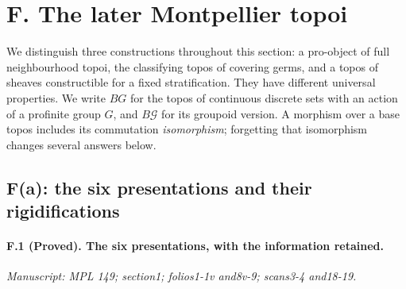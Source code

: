 \section{F. The later Montpellier topoi}
\label{sec:F}

We distinguish three constructions throughout this section: a pro-object of
full neighbourhood topoi, the classifying topos of covering germs, and a topos
of sheaves constructible for a fixed stratification. They have different
universal properties. We write $B G$ for the topos of continuous discrete
sets with an action of a profinite group $G$, and $B\mathcal G$ for its
groupoid version. A morphism over a base topos includes its commutation
\emph{isomorphism}; forgetting that isomorphism changes several answers below.

\subsection{F(a): the six presentations and their rigidifications}

\paragraph{F.1 (Proved). The six presentations, with the information retained.}
\textit{Manuscript: MPL 149; section1; folios1-1v and8v-9; scans3-4 and18-19.}

